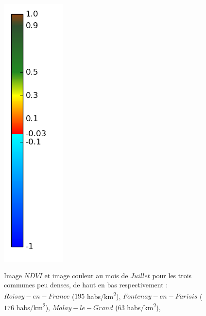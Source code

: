 \documentclass{book}
\begin{document}
\begin{figure}[H]
{\includegraphics[scale=0.3]{../3_ndvi/images/colormap.png}
}
\caption{Image $NDVI$ et image couleur au mois de $Juillet$ pour les trois communes peu denses, de haut en bas respectivement :
$Roissy-en-France$ ($195$ habs/km\textsuperscript{2}),
$Fontenay-en-Parisis$ ($176$ habs/km\textsuperscript{2}),
$Malay-le-Grand$ ($63$ habs/km\textsuperscript{2}),
}
\label{ndvi_cat3}
\end{figure}
\clearpage
\end{document}
